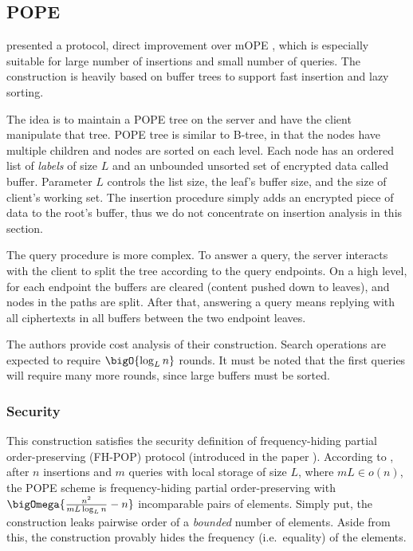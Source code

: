 \subsection{POPE}

	\textcite{pope} presented a protocol, direct improvement over mOPE \cite{ope-ideal-security-protocol}, which is especially suitable for large number of insertions and small number of queries.
	The construction is heavily based on buffer trees \cite{buffer-tree} to support fast insertion and lazy sorting.

	The idea is to maintain a POPE tree on the server and have the client manipulate that tree.
	POPE tree is similar to B-tree, in that the nodes have multiple children and nodes are sorted on each level.
	Each node has an ordered list of \emph{labels} of size $L$ and an unbounded unsorted set of encrypted data called buffer.
	Parameter $L$ controls the list size, the leaf's buffer size, and the size of client's working set.
	The insertion procedure simply adds an encrypted piece of data to the root's buffer, thus we do not concentrate on insertion analysis in this section.

	The query procedure is more complex.
	To answer a query, the server interacts with the client to split the tree according to the query endpoints.
	On a high level, for each endpoint the buffers are cleared (content pushed down to leaves), and nodes in the paths are split.
	After that, answering a query means replying with all ciphertexts in all buffers between the two endpoint leaves.

	The authors provide cost analysis of their construction.
	Search operations are expected to require $\bigO{\log_L n}$ rounds.
	It must be noted that the first queries will require many more rounds, since large buffers must be sorted.

	\subsubsection{Security}
		This construction satisfies the security definition of frequency\hyp{}hiding partial order-preserving (FH-POP) protocol (introduced in the paper \cite{pope}).
		According to \cite[Theorem~3]{pope}, after $n$ insertions and $m$ queries with local storage of size $L$, where $m L \in o(n)$, the POPE scheme is frequency-hiding partial order-preserving with $\bigOmega{ \frac{n^2}{mL \log_L n} - n }$ incomparable pairs of elements. %
		Simply put, the construction leaks pairwise order of a \emph{bounded} number of elements.
		Aside from this, the construction provably hides the frequency (i.e.\ equality) of the elements.

